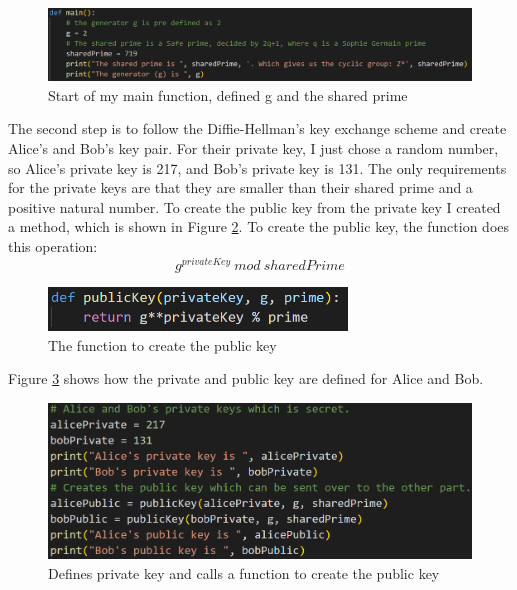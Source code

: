 \documentclass[12pt, letterpaper]{article}
\begin{document}
\begin{figure}[H]
  \includegraphics[width=\linewidth]{code_snippets/step1.PNG}
  \caption{Start of my main function, defined g and the shared prime}
  \label{fig:step1}
\end{figure}

The second step is to follow the Diffie-Hellman's key exchange scheme and create Alice's and Bob's key pair. For their private key, I just chose a random number, so Alice's private key is 217, and Bob's private key is 131. The only requirements for the private keys are that they are smaller than their shared prime and a positive natural number. To create the public key from the private key I created a method, which is shown in Figure \ref{fig:step2_func}. To create the public key, the function does this operation: $$g^{privateKey}\ mod\ sharedPrime$$

\begin{figure}[H]
  \includegraphics[width=300px]{code_snippets/step2_func.PNG}\centering
  \caption{The function to create the public key}
  \label{fig:step2_func}
\end{figure}

Figure \ref{fig:step2} shows how the private and public key are defined for Alice and Bob.

\begin{figure}[H]
  \includegraphics[width=\linewidth]{code_snippets/step2.PNG}
  \caption{Defines private key and calls a function to create the public key}
  \label{fig:step2}
\end{figure}
\end{document}

